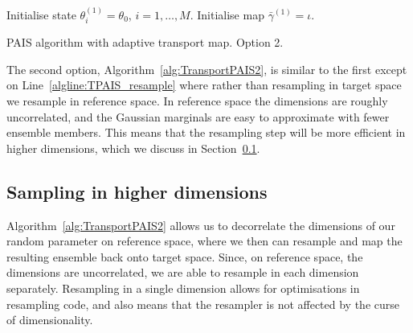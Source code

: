 \documentclass[final]{siamltex}
\begin{document}
\begin{table}
\begin{algorithm}[H]
\DontPrintSemicolon
\BlankLine
Initialise state $\theta^{(1)}_i = \theta_0$, \quad $i = 1,\dots,M$.\;
Initialise map $\bar{\gamma}^{(1)} = \iota$.\;
\caption{PAIS algorithm with adaptive transport map. Option 2.\label{alg:TransportPAIS2}}
\end{algorithm}
\end{table}

The second option, Algorithm~\ref{alg:TransportPAIS2}, is similar to the first except on Line~\ref{algline:TPAIS_resample} where rather than resampling in target space we resample in reference space. In reference space the dimensions are roughly uncorrelated, and the Gaussian marginals are easy to approximate with fewer ensemble members. This means that the resampling step will be more efficient in higher dimensions, which we discuss in Section~\ref{sec:TPAIS_higher_dim}.

\subsection{Sampling in higher dimensions}\label{sec:TPAIS_higher_dim}

Algorithm~\ref{alg:TransportPAIS2} allows us to decorrelate the dimensions of our random parameter on reference space, where we then can resample and map the resulting ensemble back onto target space. Since, on reference space, the dimensions are uncorrelated, we are able to resample in each dimension separately. Resampling in a single dimension allows for optimisations in resampling code, and also means that the resampler is not affected by the curse of dimensionality.
\end{document}
